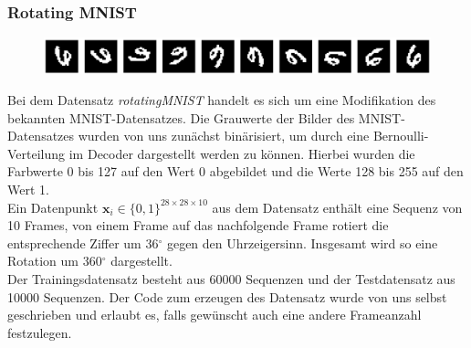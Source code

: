 \documentclass[12pt]{article}
\newcommand{\x}{\mathbf{x}_i}
\begin{document}
	\subsubsection{Rotating MNIST}
	\begin{figure}[!htbp]
		\centering
		\includegraphics[scale=0.4]{rotatingMNIST}
	\end{figure}
	Bei dem Datensatz \emph{rotatingMNIST} handelt es sich um eine Modifikation des bekannten MNIST-Datensatzes. Die Grauwerte der Bilder 
	des MNIST-Datensatzes wurden von uns zunächst binärisiert, um durch eine Bernoulli-Verteilung im Decoder dargestellt werden zu können. 
	Hierbei wurden die Farbwerte 0 bis 127 auf den Wert 0 abgebildet und die Werte 128 bis 255 auf den Wert 1. \\
	Ein Datenpunkt $\x\in \{0,1\}^{28\times 28\times 10}$ aus dem Datensatz enthält eine Sequenz von 10 Frames, von einem Frame auf das nachfolgende Frame rotiert die entsprechende Ziffer um 36$^\circ$ gegen den Uhrzeigersinn. Insgesamt wird so eine Rotation um 360$^\circ$ dargestellt. \\
	Der Trainingsdatensatz besteht aus 60000 Sequenzen und der Testdatensatz aus 10000 Sequenzen. Der Code zum erzeugen des Datensatz wurde von uns selbst geschrieben und erlaubt es, falls gewünscht auch eine andere Frameanzahl festzulegen.
\end{document}
